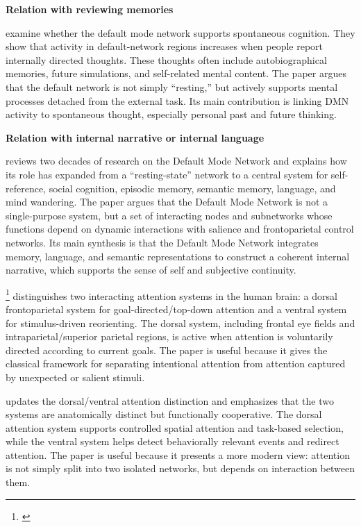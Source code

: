 \documentclass{book}
\providecommand{\ProjectDeepHeading}[2]{%
    \par\medskip\noindent\textbf{#2}\par\smallskip
}
\providecommand{\seeherefooter}[1]{\footnote{\url{#1}}}
\begin{document}
    
    \ProjectDeepHeading{10}{Relation with reviewing memories}
        \cite{andrews-hanna-2010-evidence-for-the-default-networks-role-in-spontaneous-cognition}
        examine whether the default mode network supports spontaneous cognition. They show that activity in default-network regions increases when people report internally directed thoughts. These thoughts often include autobiographical memories, future simulations, and self-related mental content. The paper argues that the default network is not simply “resting,” but actively supports mental processes detached from the external task. Its main contribution is linking DMN activity to spontaneous thought, especially personal past and future thinking.
    
    
    \ProjectDeepHeading{10}{Relation with internal narrative or internal language}
        \cite{menon-2023-20-years-of-the-default-mode-network-a-review-and-synthesis} reviews two decades of research on the Default Mode Network and explains how its role has expanded from a “resting-state” network to a central system for self-reference, social cognition, episodic memory, semantic memory, language, and mind wandering. The paper argues that the Default Mode Network is not a single-purpose system, but a set of interacting nodes and subnetworks whose functions depend on dynamic interactions with salience and frontoparietal control networks. Its main synthesis is that the Default Mode Network integrates memory, language, and semantic representations to construct a coherent internal narrative, which supports the sense of self and subjective continuity.


\seeherefooter{}
    \cite{corbetta-2002-control-of-goal-directed-and-stimulus-driven-attention-in-the-brain} distinguishes two interacting attention systems in the human brain: a dorsal frontoparietal system for goal-directed/top-down attention and a ventral system for stimulus-driven reorienting. The dorsal system, including frontal eye fields and intraparietal/superior parietal regions, is active when attention is voluntarily directed according to current goals. The paper is useful because it gives the classical framework for separating intentional attention from attention captured by unexpected or salient stimuli.
    
    \cite{vossel-2014-dorsal-and-ventral-attention-systems} updates the dorsal/ventral attention distinction and emphasizes that the two systems are anatomically distinct but functionally cooperative. The dorsal attention system supports controlled spatial attention and task-based selection, while the ventral system helps detect behaviorally relevant events and redirect attention. The paper is useful because it presents a more modern view: attention is not simply split into two isolated networks, but depends on interaction between them.
    
\end{document}
